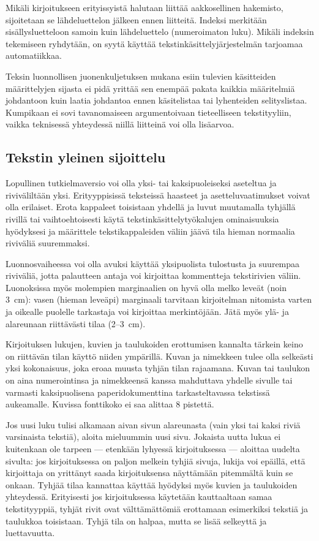 \documentclass[finnish,gradu]{tktltiki}
\begin{document}
Mikäli kirjoitukseen erityissyistä halutaan
liittää aakkosellinen hakemisto, sijoitetaan se lähdeluettelon jälkeen
ennen liitteitä. Indeksi merkitään sisällysluetteloon samoin kuin
lähdeluettelo (numeroimaton luku). Mikäli indeksin tekemiseen
ryhdytään, on syytä käyttää tekstinkäsittelyjärjestelmän tarjoamaa
automatiikkaa.

Teksin luonnollisen juonenkuljetuksen mukana esiin
tulevien käsitteiden määrittelyjen sijasta ei pidä yrittää sen enempää
pakata kaikkia määritelmiä johdantoon kuin laatia johdantoa ennen
käsitelistaa tai lyhenteiden selityslistaa. Kumpikaan ei sovi
tavanomaiseen argumentoivaan tieteelliseen tekstityyliin, vaikka
teknisessä yhteydessä niillä liitteinä voi olla lisäarvoa.


\subsection{Tekstin yleinen sijoittelu}

Lopullinen tutkielmaversio voi olla yksi- tai kaksipuoleiseksi aseteltua
ja riviväliltään yksi.  Erityyppisissä
teksteissä haasteet ja asetteluvaatimukset voivat olla erilaiset. Erota
kappaleet toisistaan yhdellä ja luvut muutamalla tyhjällä rivillä tai
vaihtoehtoisesti käytä tekstinkäsittelytyökalujen ominaisuuksia
hyödyksesi ja määrittele tekstikappaleiden väliin jäävä tila hieman
normaalia riviväliä suuremmaksi.

Luonnosvaiheessa voi olla avuksi käyttää yksipuolista tulostusta ja 
suurempaa riviväliä,  jotta palautteen antaja voi kirjoittaa kommentteja
tekstirivien väliin. Luonoksissa myös molempien marginaalien on hyvä olla
melko leveät (noin 3~cm): vasen (hieman leveäpi) marginaali tarvitaan kirjoitelman
nitomista varten ja oikealle puolelle tarkastaja voi kirjoittaa
merkintöjään.  Jätä myös ylä- ja alareunaan riittävästi tilaa (2--3~cm).

Kirjoituksen lukujen, kuvien ja taulukoiden erottumisen kannalta
tärkein keino on riittävän tilan käyttö niiden ympärillä. Kuvan ja
nimekkeen tulee olla selkeästi yksi kokonaisuus, joka eroaa muusta
tyhjän tilan rajaamana. Kuvan tai taulukon on aina numerointinsa ja
nimekkeensä kanssa mahduttava yhdelle sivulle tai varmasti
kaksipuolisena paperidokumenttina tarkasteltavassa tekstissä aukeamalle.
Kuvissa fonttikoko ei saa alittaa 8 pistettä.



Jos uusi luku tulisi alkamaan aivan sivun alareunasta (vain yksi tai
kaksi riviä varsinaista tekstiä), aloita mieluummin uusi sivu. Jokaista
uutta lukua ei kuitenkaan ole tarpeen --- etenkään lyhyessä
kirjoituksessa --- aloittaa uudelta sivulta: jos kirjoituksessa on
paljon melkein tyhjiä sivuja, lukija voi epäillä, että kirjoittaja on
yrittänyt saada kirjoituksensa näyttämään pitemmältä kuin se onkaan. 
 Tyhjää tilaa kannattaa käyttää hyödyksi myös kuvien ja taulukoiden
yhteydessä. Erityisesti jos kirjoituksessa käytetään kauttaaltaan samaa
tekstityyppiä, tyhjät rivit ovat välttämättömiä erottamaan esimerkiksi
tekstiä ja taulukkoa toisistaan. Tyhjä tila on halpaa, mutta se lisää
selkeyttä ja luettavuutta.  
\end{document}
